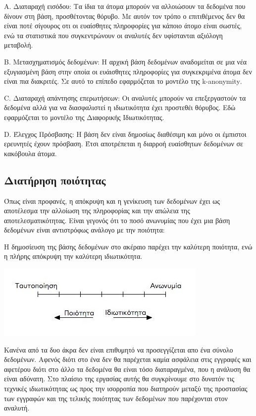 Α. Διαταραχή εισόδου: Τα ίδια τα άτομα μπορούν να αλλοιώσουν τα δεδομένα που δίνουν στη βάση, προσθέτοντας θόρυβο. Με αυτόν τον τρόπο ο επιτιθέμενος δεν θα είναι ποτέ σίγουρος οτι οι ευαίσθητες πληροφορίες για κάποιο άτομο είναι σωστές, ενώ τα στατιστικά που συγκεντρώνουν οι αναλυτές δεν υφίστανται αξιόλογη μεταβολή.

Β. Μετασχηματισμός δεδομένων: Η αρχική βάση δεδομένων αναδομείται σε μια νέα εξυγιασμένη βάση στην οποία οι ευάισθητες πληροφορίες για συγκεκριμένα άτομα δεν είναι πια διακριτές. Σε αυτό το επίπεδο εφαρμόζεται το μοντέλο της \textlatin{k-anonymity}.

\textlatin{C}. Διαταραχή απάντησης επερωτήσεων: Οι αναλυτές μπορούν να επεξεργαστούν τα δεδομένα αλλά για να διασφαλιστεί η ιδιωτικότητα έχει προστεθέι θόρυβος. Εδώ εφαρμόζεται το μοντέλο της Διαφορικής Ιδιωτικότητας.

\textlatin{D}. Έλεγχος Πρόσβασης: Η βάση δεν είναι δημοσίως διαθέσιμη και μόνο οι έμπιστοι ερευνητές έχουν πρόσβαση. Έτσι αποτρέπεται η διαρροή ευαίσθητων δεδομένων σε κακόβουλα άτομα.





\subsection{Διατήρηση ποιότητας}

Όπως είναι προφανές, η απόκρυψη και η γενίκευση των δεδομένων έχει ως αποτέλεσμα την αλλοίωση της πληροφορίας και την απώλεια της αποτελεσματικότητας. Είναι γεγονός ότι το ποσό ανωνυμίας που έχει μια βάση δεδομένων είναι αντιστρόφως ανάλογο με την ποιότητα:

Η δημοσίευση της βάσης δεδομένων στο ακέραιο παρέχει την καλύτερη ποιότητα, ενώ η πλήρης απόκρυψη την καλύτερη ιδιωτικότητα. \textlatin{\cite{Sweeney:2001:CDC:935675}}
\begin{center}
\includegraphics[scale=0.6]{images/Tension.jpg}
\end{center}
Κανένα από τα δυο άκρα δεν είναι επιθυμητό να προσεγγίζεται απο ένα σύνολο δεδομένων. Αφενός διότι στο ένα δεν θα παρέχεται καμία ασφάλεια στις εγγραφές και αφετέρου διότι στο άλλο τα δεδομένα θα είναι τόσο διαταραγμένα, που η ανάλυση θα είναι αδύνατη. Στο πλαίσιο της εργασίας αυτής θα συγκρίνουμε στο δυνατόν τις τεχνικές ιδιωτικότητας ως προς την ισορροπία που διατηρούν μεταξύ της προστασίας των εγγραφών και της τελικής ποιότητας των δεδομένων που παρέχονται στον αναλυτή. 


